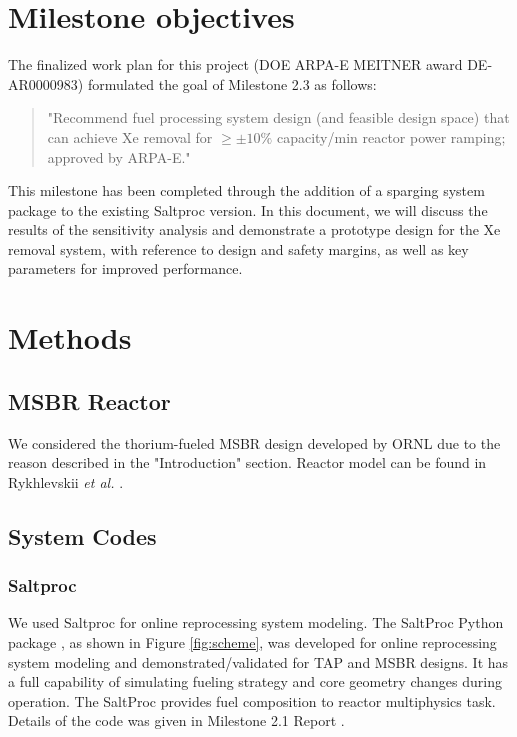 \section{Milestone objectives}

    The finalized work plan for this project (DOE ARPA-E MEITNER award DE-AR0000983) formulated the goal of Milestone 2.3 as follows:

    \begin{quotation}
        "Recommend fuel processing system design (and feasible design
        space) that can achieve Xe removal for $\ge \pm 10\%$ capacity/min reactor power ramping; approved by ARPA-E."
    \end{quotation}

    This milestone has been completed through the addition of a sparging system package to the existing Saltproc version. In this document, we will discuss the results of the sensitivity analysis and demonstrate a prototype design for the Xe removal system, with reference to design and safety margins, as well as key parameters for improved performance.

\section{Methods}

\subsection{MSBR Reactor}

    We considered the thorium-fueled MSBR design \cite{robertson_conceptual_1971} developed by ORNL due to the reason described in the "Introduction" section. Reactor model can be found in Rykhlevskii \emph{et al.} \cite{rykhlevskii_modeling_2019}.

\subsection{System Codes}

\subsubsection{Saltproc}

    We used Saltproc for online reprocessing system modeling. The SaltProc Python package \cite{rykhlevskii_saltproc_2018}, as shown in Figure \ref{fig:scheme}, was developed for online reprocessing system modeling and demonstrated/validated for TAP and MSBR designs. It has a full capability of simulating fueling strategy and core geometry changes during operation. The SaltProc provides fuel composition to reactor multiphysics task. Details of the code was given in Milestone 2.1 Report \cite{rykhlevskii_milestone_2019}.


